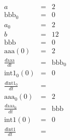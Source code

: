 \documentclass{article}
\begin{document}
\begin{eqnarray*}
a&=&2\\
\mathrm{bbb}_{0}&=&0\\
a_{0}&=&2\\
b&=&12\\
\mathrm{bbb}&=&0\\
\mathrm{aaa}(0)&=&2\\
\frac{ d \mathrm{aaa}}{dt} &=&\mathrm{bbb}_{0}\\
\mathrm{int1}_{0}(0)&=&0\\
\frac{ d \mathrm{int1}_{0}}{dt} &=&\\
\mathrm{aaa}_{0}(0)&=&2\\
\frac{ d \mathrm{aaa}_{0}}{dt} &=&\mathrm{bbb}\\
\mathrm{int1}(0)&=&0\\
\frac{ d \mathrm{int1}}{dt} &=&\\
\end{eqnarray*}
\end{document}
